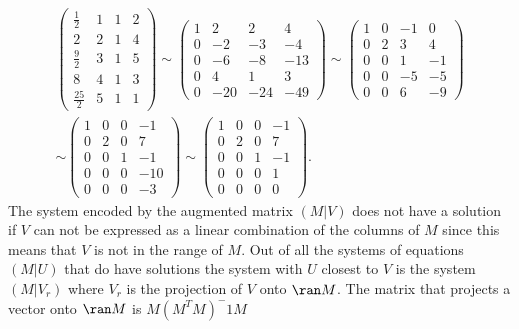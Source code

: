 \documentclass[12pt]{article}
\begin{document}
\begin{gather*}
\left( \begin{array}{rrr|c}
\frac12 &1&1&2\\
2&2&1&4\\
\frac92 &3&1&5\\
8&4&1&3\\
\frac{25}{2} &5&1&1
\end{array} \right)
\sim 
\left( \begin{array}{rrr|r}
1 &2&2&4\\
0      &-2&-3&-4\\
0&-6&-8&-13\\
0&4&1&3\\
0&-20&-24&-49
\end{array} \right)
%
\sim 
\left( \begin{array}{rrr|r}
1 &0&-1&0\\
0      &2&3&4\\
0&0&1&-1\\
0&0&-5&-5\\
0&0&6&-9
\end{array} \right)
\\
\sim 
\left( \begin{array}{rrr|r}
1 &0&0&-1\\
0      &2&0&7\\
0&0&1&-1\\
0&0&0&-10\\
0&0&0&-3
\end{array} \right)
\sim 
\left( \begin{array}{rrr|r}
1 &0&0&-1\\
0      &2&0&7\\
0&0&1&-1\\
0&0&0&1\\
0&0&0&0
\end{array} \right).
\end{gather*}
The system encoded by the augmented matrix $(M|V)$ does not have a solution if $V$ can not be expressed as a linear combination of the columns of $M$ since this means that $V$ is not in the range of $M$. 
Out of all the systems of equations $(M|U)$ that do have solutions the system with $U$ closest to $V$ is the system $(M|V_r)$ where $V_r$ is the projection of 
$V$ onto $\ran M$. The matrix that projects a vector onto $\ran M$ is 
$M(M^TM)^-1 M $
\end{document}
